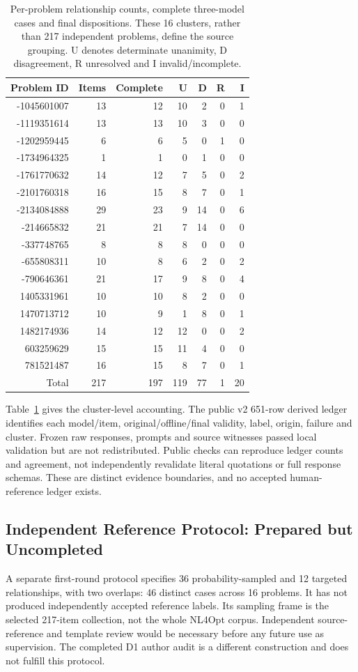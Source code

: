 \begin{table}[htbp]\centering\small
\caption{Per-problem relationship counts, complete three-model cases and final dispositions. These 16 clusters, rather than 217 independent problems, define the source grouping. U denotes determinate unanimity, D disagreement, R unresolved and I invalid/incomplete.}\label{tab:relationship-clusters}
\begin{tabular}{@{}rrrrrrr@{}}\toprule
Problem ID & Items & Complete & U & D & R & I\\\midrule
-1045601007 & 13 & 12 & 10 & 2 & 0 & 1\\
-1119351614 & 13 & 13 & 10 & 3 & 0 & 0\\
-1202959445 & 6 & 6 & 5 & 0 & 1 & 0\\
-1734964325 & 1 & 1 & 0 & 1 & 0 & 0\\
-1761770632 & 14 & 12 & 7 & 5 & 0 & 2\\
-2101760318 & 16 & 15 & 8 & 7 & 0 & 1\\
-2134084888 & 29 & 23 & 9 & 14 & 0 & 6\\
-214665832 & 21 & 21 & 7 & 14 & 0 & 0\\
-337748765 & 8 & 8 & 8 & 0 & 0 & 0\\
-655808311 & 10 & 8 & 6 & 2 & 0 & 2\\
-790646361 & 21 & 17 & 9 & 8 & 0 & 4\\
1405331961 & 10 & 10 & 8 & 2 & 0 & 0\\
1470713712 & 10 & 9 & 1 & 8 & 0 & 1\\
1482174936 & 14 & 12 & 12 & 0 & 0 & 2\\
603259629 & 15 & 15 & 11 & 4 & 0 & 0\\
781521487 & 16 & 15 & 8 & 7 & 0 & 1\\
\midrule
Total & 217 & 197 & 119 & 77 & 1 & 20\\\bottomrule
\end{tabular}\end{table}

Table~\ref{tab:relationship-clusters} gives the cluster-level accounting. The public v2 651-row derived ledger identifies each model/item, original/offline/final validity, label, origin, failure and cluster. Frozen raw responses, prompts and source witnesses passed local validation but are not redistributed. Public checks can reproduce ledger counts and agreement, not independently revalidate literal quotations or full response schemas. These are distinct evidence boundaries, and no accepted human-reference ledger exists.

\subsection{Independent Reference Protocol: Prepared but Uncompleted}
\label{app:future-reference}
A separate first-round protocol specifies 36 probability-sampled and 12 targeted relationships, with two overlaps: 46 distinct cases across 16 problems. It has not produced independently accepted reference labels. Its sampling frame is the selected 217-item collection, not the whole NL4Opt corpus. Independent source-reference and template review would be necessary before any future use as supervision. The completed D1 author audit is a different construction and does not fulfill this protocol.
